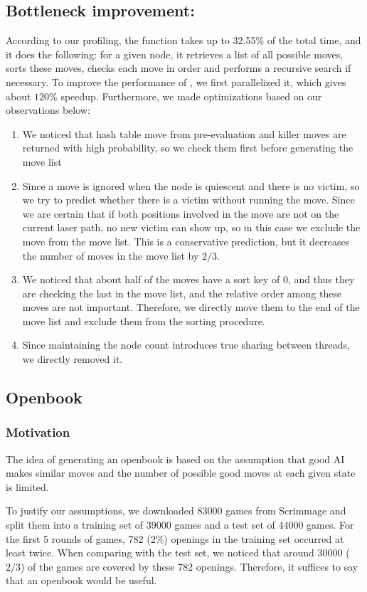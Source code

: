 \documentclass[10pt,twosidep]{article}
\begin{document}
\subsection{Bottleneck improvement: \scs}
According to our profiling, the function \scs takes up to 32.55\% of the total time, and it does the following: for a given node, it retrieves a list of all possible moves, sorts these moves, checks each move in order and performs a recursive search if necessary. To improve the performance of \scs, we first parallelized it, which gives  about $120\%$ speedup. Furthermore, we made optimizations based on our observations below: 
\begin{enumerate}
    \item We noticed that hash table move from pre-evaluation and killer moves are returned with high probability, so we check them first before generating the move list
    \item Since a move is ignored when the node is quiescent and there is no victim, so we try to predict whether there is a victim without running the move. Since we are certain that if both  positions involved in the move are not on the current laser path, no new victim can show up, so in this case we exclude the move from the move list. This is a conservative prediction, but it decreases the number of moves in the move list by $2/3$. 
    \item We noticed that about half of the moves have a sort key of 0, and thus they are checking the last in the move list, and the relative order among these moves are not important. Therefore, we directly move them to the end of the move list and exclude them from the sorting procedure. 
    \item Since maintaining the node count introduces true sharing between threads, we directly removed it. 
\end{enumerate}

\subsection{Openbook}
\subsubsection{Motivation}
The idea of generating an openbook is based on the assumption that good AI makes similar moves and the number of possible good moves at each given state is limited. 

To justify our assumptions, we downloaded 83000 games from Scrimmage and split them into a training set of 39000 games and a test set of 44000 games. For the first 5 rounds of games, 782 (2\%) openings in the training set occurred at least twice. When comparing with the test set, we noticed that around 30000 ($2/3$) of the games are covered by these 782 openings. Therefore, it suffices to say that an openbook would be useful. 
\end{document}

